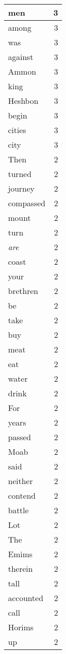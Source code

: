 \begin{center}
\begin{longtable}{l|r}
men & 3 \\ \hline
among & 3 \\ \hline
was & 3 \\ \hline
against & 3 \\ \hline
Ammon & 3 \\ \hline
king & 3 \\ \hline
Heshbon & 3 \\ \hline
begin & 3 \\ \hline
cities & 3 \\ \hline
city & 3 \\ \hline
Then & 2 \\ \hline
turned & 2 \\ \hline
journey & 2 \\ \hline
compassed & 2 \\ \hline
mount & 2 \\ \hline
turn & 2 \\ \hline
\emph{are} & 2 \\ \hline
coast & 2 \\ \hline
your & 2 \\ \hline
brethren & 2 \\ \hline
be & 2 \\ \hline
take & 2 \\ \hline
buy & 2 \\ \hline
meat & 2 \\ \hline
eat & 2 \\ \hline
water & 2 \\ \hline
drink & 2 \\ \hline
For & 2 \\ \hline
years & 2 \\ \hline
passed & 2 \\ \hline
Moab & 2 \\ \hline
said & 2 \\ \hline
neither & 2 \\ \hline
contend & 2 \\ \hline
battle & 2 \\ \hline
Lot & 2 \\ \hline
The & 2 \\ \hline
Emims & 2 \\ \hline
therein & 2 \\ \hline
tall & 2 \\ \hline
accounted & 2 \\ \hline
call & 2 \\ \hline
Horims & 2 \\ \hline
up & 2 \\ \hline

\end{longtable}
\end{center}
